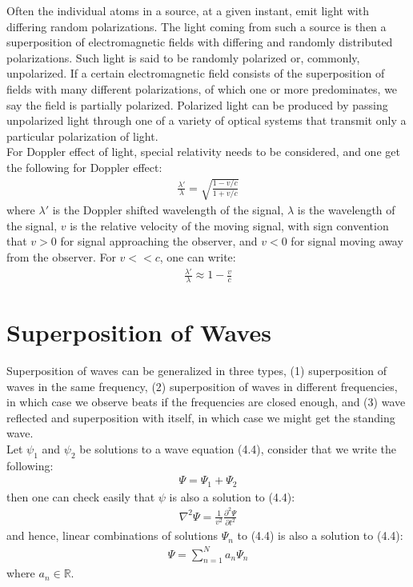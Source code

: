 \documentclass[11pt]{book}
\theoremstyle{break}
\theoremstyle{break}
\newcommand{\R}{\mathbb{R}}
\begin{document}
Often the individual atoms in a source, at a given instant, emit light with differing random polarizations. The light coming from such a source is then a superposition of electromagnetic fields with differing and randomly distributed
polarizations. Such light is said to be randomly polarized or, commonly, unpolarized. If a certain electromagnetic field consists of the superposition of
fields with many different polarizations, of which one or more predominates,
we say the field is partially polarized. Polarized light can be produced by passing unpolarized light through one of a variety of optical systems that transmit only a particular polarization of light.\\

For Doppler effect of light, special relativity needs to be considered, and one get the following for Doppler effect:
\begin{align*}
\frac{\lambda'}{\lambda} = \sqrt{\frac{1-v/c}{1+v/c}}
\end{align*}
where $\lambda'$ is the Doppler shifted wavelength of the signal, $\lambda$ is the wavelength of the signal, $v$ is the relative velocity of the moving signal, with sign convention that $v>0$ for signal approaching the observer, and $v<0$ for signal moving away from the observer. For $v<<c$, one can write:
\begin{align*}
\frac{\lambda'}{\lambda} \approx 1- \frac{v}{c}
\end{align*}

\newpage
\section[Superposition of Waves]{\color{red} Superposition of Waves\color{black}}
Superposition of waves can be generalized in three types, (1) superposition of waves in the same frequency, (2) superposition of waves in different frequencies, in which case we observe beats if the frequencies are closed enough, and (3) wave reflected and superposition with itself, in which case we might get the standing wave. \\

Let $\psi_1$ and $\psi_2$ be solutions to a wave equation (4.4), consider that we write the following:
\begin{align*}
\Psi = \Psi_1 + \Psi_2
\end{align*}
then one can check easily that $\psi$ is also a solution to (4.4):
\begin{align*}
\nabla^2 \Psi = \frac{1}{v^2}\frac{\partial^2 \Psi}{\partial t^2}
\end{align*}
and hence, linear combinations of solutions $\Psi_n$ to (4.4) is also a solution to (4.4):
\begin{align*}
\Psi = \sum_{n=1}^N a_n \Psi_n
\end{align*}
 where $a_n \in \R$.\\
 
\end{document}
